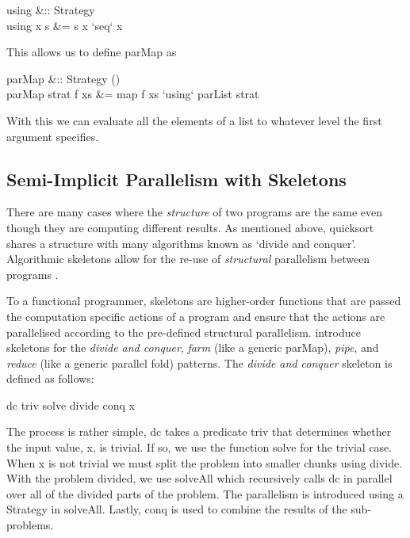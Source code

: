 \begin{haskell}
using &:: \hasalpha \to Strategy \hasalpha \to \hasalpha\\
using x s &= s x `seq` x
\end{haskell}

This allows us to define \<parMap\> as

\begin{haskell}
parMap &:: Strategy \hasbeta \to (\hasalpha \to \hasbeta) \to [\hasalpha] \to [\hasbeta]\\
parMap strat f xs &= map f xs `using` parList strat
\end{haskell}

With this we can evaluate all the elements of a list to whatever level the
first argument specifies.

\subsection{Semi-Implicit Parallelism with Skeletons}

There are many cases where the \emph{structure} of two programs are the same
even though they are computing different results. As mentioned above,
\<quicksort\> shares a structure with many algorithms known as `divide and
conquer'. Algorithmic skeletons allow for the re-use of \emph{structural}
parallelism between programs \citep{skeletons}.

To a functional programmer, skeletons are higher-order functions that are
passed the computation specific actions of a program and ensure that the
actions are parallelised according to the pre-defined structural parallelism.
\citet{skeletons} introduce skeletons for the \emph{divide and conquer},
\emph{farm} (like a generic \<parMap\>), \emph{pipe}, and \emph{reduce} (like a generic
parallel \<fold\>) patterns. The \emph{divide and conquer} skeleton is defined as follows:

\begin{haskell}
dc triv solve divide conq x 
\end{haskell}

The process is rather simple, \<dc\> takes a predicate \<triv\> that determines
whether the input value, \<x\>, is trivial. If so, we use the function
\<solve\> for the trivial case. When \<x\> is not trivial we must split the
problem into smaller chunks using \<divide\>. With the problem divided, we use
\<solveAll\> which recursively calls \<dc\> in parallel over all of the divided
parts of the problem. The parallelism is introduced using a Strategy in
\<solveAll\>. Lastly, \<conq\> is used to combine the results of the
sub-problems.

